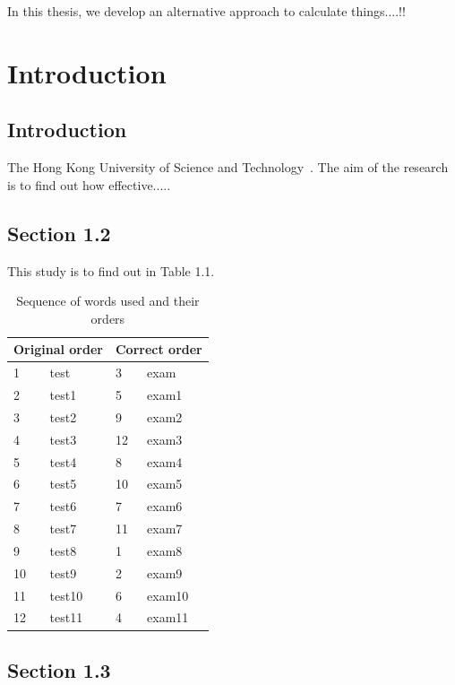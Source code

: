\documentclass[12pt,a4]{report}
\begin{document}
In this thesis, we develop an alternative approach to calculate things....!!


\newpage
{}

\chapter{Introduction}

\section{Introduction}

The Hong Kong University of Science and Technology~\cite{C. D. Mee}.
The aim of the research~\cite{S. Tehrani} is to find out how
effective.....

\section{Section 1.2}

This study is to find out in Table 1.1.
\begin{table}[ht]
\begin{center}
\begin{tabular}{|l|l||l|l|}
\hline
\multicolumn{2}{|c||}{Original order} & \multicolumn{2}{c|}{Correct order} \\ \hline
1 & test & 3 & exam \\
2 & test1 & 5 & exam1 \\
3 & test2 & 9 & exam2 \\
4 & test3 & 12 & exam3 \\
5 & test4 & 8 & exam4 \\
6 & test5 & 10 & exam5 \\
7 & test6 & 7 & exam6 \\
8 & test7 & 11 & exam7 \\
9 & test8 & 1 & exam8 \\
10 & test9 & 2 & exam9 \\
11 & test10 & 6 & exam10 \\
12 & test11 & 4 & exam11 \\ \hline
\end{tabular}
\caption{Sequence of words used and their orders}
\end{center}
\end{table}

\section{Section 1.3}
\end{document}
